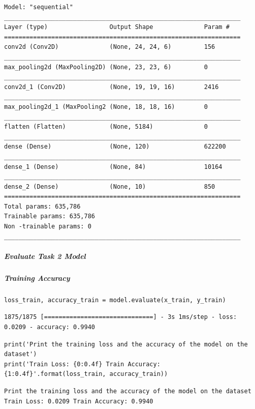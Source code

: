 \begin{verbatim}
Model: "sequential"
_________________________________________________________________
Layer (type)                 Output Shape              Param #   
=================================================================
conv2d (Conv2D)              (None, 24, 24, 6)         156       
_________________________________________________________________
max_pooling2d (MaxPooling2D) (None, 23, 23, 6)         0         
_________________________________________________________________
conv2d_1 (Conv2D)            (None, 19, 19, 16)        2416      
_________________________________________________________________
max_pooling2d_1 (MaxPooling2 (None, 18, 18, 16)        0         
_________________________________________________________________
flatten (Flatten)            (None, 5184)              0         
_________________________________________________________________
dense (Dense)                (None, 120)               622200    
_________________________________________________________________
dense_1 (Dense)              (None, 84)                10164     
_________________________________________________________________
dense_2 (Dense)              (None, 10)                850       
=================================================================
Total params: 635,786
Trainable params: 635,786
Non -trainable params: 0
_________________________________________________________________
\end{verbatim}

\subparagraph{Evaluate Task 2 Model}

\subparagraph{Training Accuracy}

\begin{verbatim}
loss_train, accuracy_train = model.evaluate(x_train, y_train)
\end{verbatim}

\begin{verbatim}
1875/1875 [==============================] - 3s 1ms/step - loss: 0.0209 - accuracy: 0.9940
\end{verbatim}

\begin{verbatim}
print('Print the training loss and the accuracy of the model on the dataset')
print('Train Loss: {0:0.4f} Train Accuracy: {1:0.4f}'.format(loss_train, accuracy_train))
\end{verbatim}

\begin{verbatim}
Print the training loss and the accuracy of the model on the dataset
Train Loss: 0.0209 Train Accuracy: 0.9940
\end{verbatim}

